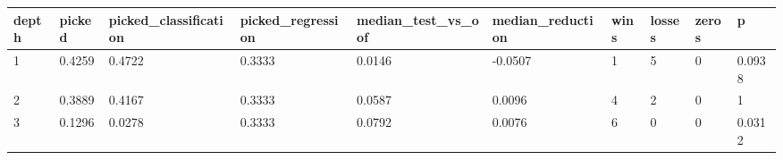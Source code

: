 \begin{tabular}{llllllllll}
\toprule
depth & picked & picked\_classification & picked\_regression & median\_test\_vs\_oof & median\_reduction & wins & losses & zeros & p \\
\midrule
1 & 0.4259 & 0.4722 & 0.3333 & 0.0146 & -0.0507 & 1 & 5 & 0 & 0.0938 \\
2 & 0.3889 & 0.4167 & 0.3333 & 0.0587 & 0.0096 & 4 & 2 & 0 & 1 \\
3 & 0.1296 & 0.0278 & 0.3333 & 0.0792 & 0.0076 & 6 & 0 & 0 & 0.0312 \\
\bottomrule
\end{tabular}
